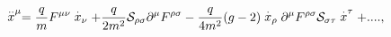 \begin{equation}
\stackrel{..}{x}^{\mu }=\frac{q}{m}F^{\mu \nu }\stackrel{.}{x}_{\nu }+\frac{q%
}{2m^{2}}\mathcal{S}_{\rho \sigma }\partial ^{\mu }F^{\rho \sigma }-\frac{q}{%
4m^{2}}(g-2)\stackrel{.}{x}_{\rho }\partial ^{\mu }F^{\rho \sigma }\mathcal{S%
}_{\sigma \tau }\stackrel{.}{x}^{\tau }+....,
\end{equation}

